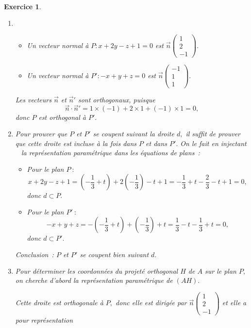 \documentclass[10pt]{article}
\newtheorem{exo}{Exercice}
\begin{document}
\begin{exo}



\begin{enumerate}
\item

\begin{itemize}
\item[\textbullet] Un vecteur normal à $P:x+2y-z+1=0$ est $\overrightarrow{n}\begin{pmatrix}1\\2\\-1\end{pmatrix}.$
\item[\textbullet] Un vecteur normal à $P':-x+y+z=0$ est $\overrightarrow{n}\begin{pmatrix}-1\\1\\1\end{pmatrix}.$
\end{itemize}

Les vecteurs $\overrightarrow{n}$ et $\overrightarrow{n}'$ sont orthogonaux, puisque
\[\overrightarrow{n}\cdot \overrightarrow{n}'=1\times (-1)+2\times 1+(-1)\times 1=0,\]
donc $P$ est orthogonal à $P'.$
\item Pour prouver que $P$ et $P'$ se coupent suivant la droite $d,$ il suffit de prouver que cette droite est incluse à la fois dans $P$ et dans $P'.$ On le fait en \og injectant \fg~{} la représentation paramétrique dans les équations de plans~:

\medskip
\begin{itemize}
\item[\textbullet] Pour le plan $P~:$
\[x+2y-z+1=\left(-\frac{1}{3}+t\right)+2\left(-\frac{1}{3}\right)-t+1=-\frac{1}{3}+t-\frac{2}{3}-t+1=0,\]
donc $d\subset P.$
\item[\textbullet] Pour le plan $P'~:$
\[-x+y+z=-\left(-\frac{1}{3}+t\right)+\left(-\frac{1}{3}\right)+t=\frac{1}{3}-t-\frac{1}{3}+t=0,\]
donc $d\subset P'.$
\end{itemize}

\medskip

Conclusion~: $P$ et $P'$ se coupent bien suivant $d.$


\item Pour déterminer les coordonnées du projeté orthogonal $H$ de $A$ sur le plan $P,$ on cherche d'abord la représentation paramétrique de $(AH).$

\medskip

Cette droite est orthogonale à $P,$ donc elle est dirigée par $\overrightarrow{n}\begin{pmatrix}1\\2\\-1\end{pmatrix}$ et elle a pour représentation



\end{enumerate}
\end{exo}
\end{document}
